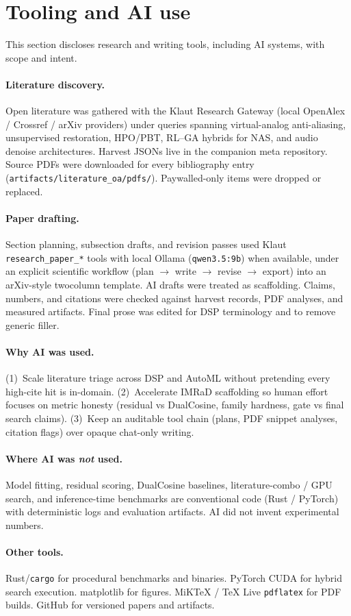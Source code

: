 \section{Tooling and AI use}
\label{sec:tooling}

This section discloses research and writing tools, including AI systems, with
scope and intent.

\paragraph{Literature discovery.}
Open literature was gathered with the Klaut Research Gateway (local OpenAlex /
Crossref / arXiv providers) under queries spanning virtual-analog anti-aliasing,
unsupervised restoration, HPO/PBT, RL--GA hybrids for NAS, and audio denoise
architectures.
Harvest JSONs live in the companion meta repository.
Source PDFs were downloaded for every bibliography entry
(\texttt{artifacts/literature\_oa/pdfs/}).
Paywalled-only items were dropped or replaced.

\paragraph{Paper drafting.}
Section planning, subsection drafts, and revision passes used Klaut
\texttt{research\_paper\_*} tools with local Ollama (\texttt{qwen3.5:9b}) when
available, under an explicit scientific workflow (plan $\rightarrow$ write
$\rightarrow$ revise $\rightarrow$ export) into an arXiv-style twocolumn
template.
AI drafts were treated as scaffolding. Claims, numbers, and citations
were checked against harvest records, PDF analyses, and measured artifacts.
Final prose was edited for DSP terminology and to remove generic filler.

\paragraph{Why AI was used.}
(1)~Scale literature triage across DSP and AutoML without pretending every
high-cite hit is in-domain.
(2)~Accelerate IMRaD scaffolding so human effort
focuses on metric honesty (residual vs DualCosine, family hardness, gate vs
final search claims).
(3)~Keep an auditable tool chain (plans, PDF
snippet analyses, citation flags) over opaque chat-only writing.

\paragraph{Where AI was \emph{not} used.}
Model fitting, residual scoring, DualCosine baselines, literature-combo /
GPU search, and inference-time benchmarks are conventional code (Rust / PyTorch)
with deterministic logs and evaluation artifacts.
AI did not invent experimental numbers.

\paragraph{Other tools.}
Rust/\texttt{cargo} for procedural benchmarks and binaries. PyTorch CUDA
for hybrid search execution. matplotlib for figures. MiKTeX / TeX Live \texttt{pdflatex}
for PDF builds. GitHub for versioned papers and artifacts.
